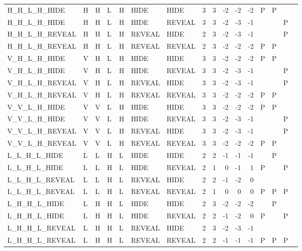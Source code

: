 \begin{longtable}{lllllllrrrrrllll}
  H\_H\_L\_H\_HIDE & H & H & L & H & HIDE & HIDE & 3 & 3 & -2 & -2 & -2 & P & P &  &  \\ 
  H\_H\_L\_H\_HIDE & H & H & L & H & HIDE & REVEAL & 3 & 3 & -2 & -3 & -1 &  &  & P &  \\ 
  H\_H\_L\_H\_REVEAL & H & H & L & H & REVEAL & HIDE & 2 & 3 & -2 & -3 & -1 &  &  & P &  \\ 
  H\_H\_L\_H\_REVEAL & H & H & L & H & REVEAL & REVEAL & 2 & 3 & -2 & -2 & -2 & P & P &  &  \\ 
  V\_H\_L\_H\_HIDE & V & H & L & H & HIDE & HIDE & 3 & 3 & -2 & -2 & -2 & P & P &  &  \\ 
  V\_H\_L\_H\_HIDE & V & H & L & H & HIDE & REVEAL & 3 & 3 & -2 & -3 & -1 &  &  & P &  \\ 
  V\_H\_L\_H\_REVEAL & V & H & L & H & REVEAL & HIDE & 3 & 3 & -2 & -3 & -1 &  &  & P &  \\ 
  V\_H\_L\_H\_REVEAL & V & H & L & H & REVEAL & REVEAL & 3 & 3 & -2 & -2 & -2 & P & P &  &  \\ 
  V\_V\_L\_H\_HIDE & V & V & L & H & HIDE & HIDE & 3 & 3 & -2 & -2 & -2 & P & P &  &  \\ 
  V\_V\_L\_H\_HIDE & V & V & L & H & HIDE & REVEAL & 3 & 3 & -2 & -3 & -1 &  &  & P &  \\ 
  V\_V\_L\_H\_REVEAL & V & V & L & H & REVEAL & HIDE & 3 & 3 & -2 & -3 & -1 &  &  & P &  \\ 
  V\_V\_L\_H\_REVEAL & V & V & L & H & REVEAL & REVEAL & 3 & 3 & -2 & -2 & -2 & P & P &  &  \\ 
  L\_L\_H\_L\_HIDE & L & L & H & L & HIDE & HIDE & 2 & 2 & -1 & -1 & -1 &  & P &  &  \\ 
  L\_L\_H\_L\_HIDE & L & L & H & L & HIDE & REVEAL & 2 & 1 & 0 & -1 & 1 & P &  & P &  \\ 
  L\_L\_H\_L\_REVEAL & L & L & H & L & REVEAL & HIDE & 2 & 2 & -1 & -2 & 0 &  &  &  &  \\ 
  L\_L\_H\_L\_REVEAL & L & L & H & L & REVEAL & REVEAL & 2 & 1 & 0 & 0 & 0 & P & P & P &  \\ 
  L\_H\_H\_L\_HIDE & L & H & H & L & HIDE & HIDE & 2 & 3 & -2 & -2 & -2 &  & P &  &  \\ 
  L\_H\_H\_L\_HIDE & L & H & H & L & HIDE & REVEAL & 2 & 2 & -1 & -2 & 0 & P &  & P &  \\ 
  L\_H\_H\_L\_REVEAL & L & H & H & L & REVEAL & HIDE & 2 & 3 & -2 & -3 & -1 &  &  &  &  \\ 
  L\_H\_H\_L\_REVEAL & L & H & H & L & REVEAL & REVEAL & 2 & 2 & -1 & -1 & -1 & P & P & P &  \\ 

\end{longtable}
